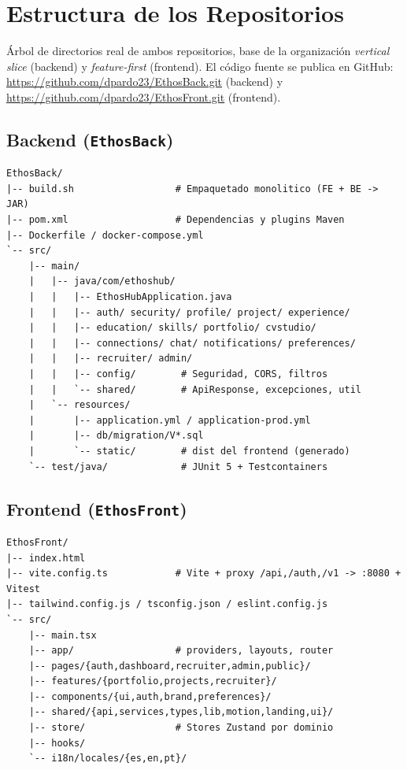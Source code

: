 \chapter{Estructura de los Repositorios}
\label{cap:anexo_repos}

Árbol de directorios real de ambos repositorios, base de la organización \textit{vertical slice}
(backend) y \textit{feature-first} (frontend). El código fuente se publica en GitHub:
\url{https://github.com/dpardo23/EthosBack.git} (backend) y
\url{https://github.com/dpardo23/EthosFront.git} (frontend).\par

\section{Backend (\texttt{EthosBack})}
\label{sec:anexo_repo_be}
\begin{lstlisting}[caption={Estructura del repositorio backend.}, label={lst:anexo_be_tree}]
EthosBack/
|-- build.sh                  # Empaquetado monolitico (FE + BE -> JAR)
|-- pom.xml                   # Dependencias y plugins Maven
|-- Dockerfile / docker-compose.yml
`-- src/
    |-- main/
    |   |-- java/com/ethoshub/
    |   |   |-- EthosHubApplication.java
    |   |   |-- auth/ security/ profile/ project/ experience/
    |   |   |-- education/ skills/ portfolio/ cvstudio/
    |   |   |-- connections/ chat/ notifications/ preferences/
    |   |   |-- recruiter/ admin/
    |   |   |-- config/        # Seguridad, CORS, filtros
    |   |   `-- shared/        # ApiResponse, excepciones, util
    |   `-- resources/
    |       |-- application.yml / application-prod.yml
    |       |-- db/migration/V*.sql
    |       `-- static/        # dist del frontend (generado)
    `-- test/java/             # JUnit 5 + Testcontainers
\end{lstlisting}

\clearpage
\section{Frontend (\texttt{EthosFront})}
\label{sec:anexo_repo_fe}
\begin{lstlisting}[caption={Estructura del repositorio frontend.}, label={lst:anexo_fe_tree}]
EthosFront/
|-- index.html
|-- vite.config.ts            # Vite + proxy /api,/auth,/v1 -> :8080 + Vitest
|-- tailwind.config.js / tsconfig.json / eslint.config.js
`-- src/
    |-- main.tsx
    |-- app/                  # providers, layouts, router
    |-- pages/{auth,dashboard,recruiter,admin,public}/
    |-- features/{portfolio,projects,recruiter}/
    |-- components/{ui,auth,brand,preferences}/
    |-- shared/{api,services,types,lib,motion,landing,ui}/
    |-- store/                # Stores Zustand por dominio
    |-- hooks/
    `-- i18n/locales/{es,en,pt}/
\end{lstlisting}

